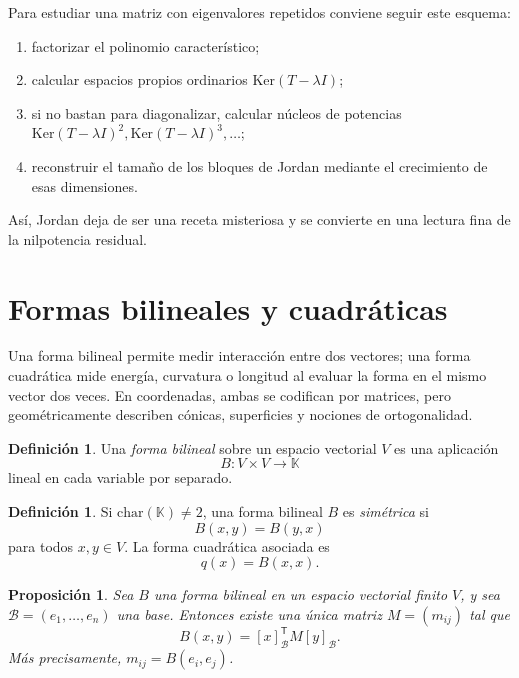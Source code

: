 \documentclass[10pt,a4paper,oneside]{article}
\theoremstyle{plain}
\newtheorem{proposition}[theorem]{Proposición}
\theoremstyle{definition}
\newtheorem{definition}[theorem]{Definición}
\theoremstyle{remark}
\newcommand{\K}{\mathbb{K}}
\newcommand{\Ker}{\mathrm{Ker}}
\newcommand{\transpose}{^{\mathsf{T}}}
\begin{document}
\begin{methodBox}
Para estudiar una matriz con eigenvalores repetidos conviene seguir este esquema:
\begin{enumerate}[label=\textup{(\arabic*)}]
\item factorizar el polinomio característico;
\item calcular espacios propios ordinarios \(\Ker(T-\lambda I)\);
\item si no bastan para diagonalizar, calcular núcleos de potencias \(\Ker(T-\lambda I)^2,\Ker(T-\lambda I)^3,\dots\);
\item reconstruir el tamaño de los bloques de Jordan mediante el crecimiento de esas dimensiones.
\end{enumerate}
Así, Jordan deja de ser una receta misteriosa y se convierte en una lectura fina de la nilpotencia residual.
\end{methodBox}

\section{Formas bilineales y cuadráticas}
\begin{ideaBox}
Una forma bilineal permite medir interacción entre dos vectores; una forma cuadrática mide energía, curvatura o longitud al evaluar la forma en el mismo vector dos veces. En coordenadas, ambas se codifican por matrices, pero geométricamente describen cónicas, superficies y nociones de ortogonalidad.
\end{ideaBox}
\begin{definition}
Una \emph{forma bilineal} sobre un espacio vectorial \(V\) es una aplicación
\[
B:V\times V\to\K
\]
lineal en cada variable por separado.
\end{definition}

\begin{definition}
Si \(\mathrm{char}(\K)\neq 2\), una forma bilineal \(B\) es \emph{simétrica} si
\[
B(x,y)=B(y,x)
\]
para todos \(x,y\in V\). La forma cuadrática asociada es
\[
q(x)=B(x,x).
\]
\end{definition}

\begin{proposition}
Sea \(B\) una forma bilineal en un espacio vectorial finito \(V\), y sea \(\mathcal{B}=(e_1,\dots,e_n)\) una base. Entonces existe una única matriz \(M=(m_{ij})\) tal que
\[
B(x,y)=[x]_{\mathcal{B}}\transpose M [y]_{\mathcal{B}}.
\]
Más precisamente, \(m_{ij}=B(e_i,e_j)\).
\end{proposition}
\end{document}
